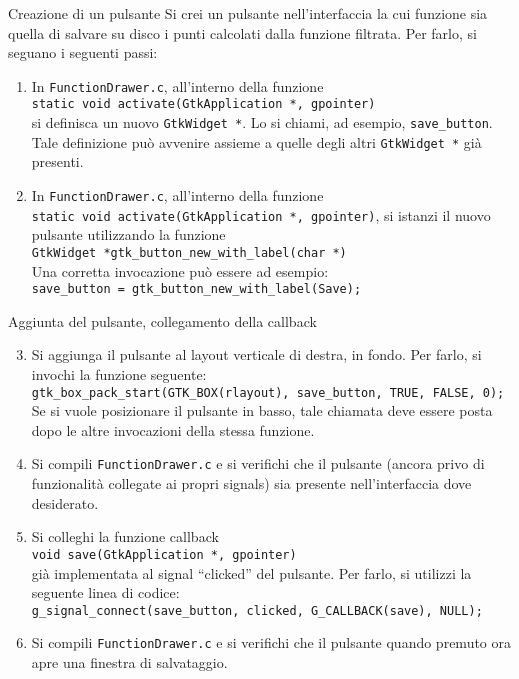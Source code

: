 \documentclass{beamer}
\begin{document}
\begin{frame}[fragile]{Creazione di un pulsante}
Si crei un pulsante nell'interfaccia la cui funzione sia quella di salvare su disco i punti calcolati dalla funzione filtrata. Per farlo, si seguano i seguenti passi:
\begin{enumerate}
 \item In \texttt{FunctionDrawer.c}, all'interno della funzione \\ \texttt{static void activate(GtkApplication *, gpointer)} \\ si definisca un nuovo \texttt{GtkWidget *}. Lo si chiami, ad esempio, \texttt{save\_button}. Tale definizione può avvenire assieme a quelle degli altri \texttt{GtkWidget *} già presenti.
 \item In \texttt{FunctionDrawer.c}, all'interno della funzione \\ \texttt{static void activate(GtkApplication *, gpointer)}, si istanzi il nuovo pulsante utilizzando la funzione\\ \texttt{GtkWidget *gtk\_button\_new\_with\_label(char *)}\\ Una corretta invocazione può essere ad esempio: \\ \texttt{save\_button = gtk\_button\_new\_with\_label(\textquotedbl{}Save\textquotedbl{});}
\end{enumerate}
\end{frame}

\begin{frame}[fragile]{Aggiunta del pulsante, collegamento della callback}
\begin{enumerate}
\setcounter{enumi}{2}
 \item Si aggiunga il pulsante al layout verticale di destra, in fondo. Per farlo, si invochi la funzione seguente: \\ \texttt{gtk\_box\_pack\_start(GTK\_BOX(rlayout), save\_button, TRUE, FALSE, 0);} \\ Se si vuole posizionare il pulsante in basso, tale chiamata deve essere posta dopo le altre invocazioni della stessa funzione.
 \item Si compili \texttt{FunctionDrawer.c} e si verifichi che il pulsante (ancora privo di funzionalità collegate ai propri signals) sia presente nell'interfaccia dove desiderato.
 \item Si colleghi la funzione callback \\ \texttt{void save(GtkApplication *, gpointer)} \\ già implementata al signal ``clicked'' del pulsante. Per farlo, si utilizzi la seguente linea di codice: \\ \texttt{g\_signal\_connect(save\_button, \textquotedbl{}clicked\textquotedbl{}, G\_CALLBACK(save), NULL);}
 \item Si compili \texttt{FunctionDrawer.c} e si verifichi che il pulsante quando premuto ora apre una finestra di salvataggio.
\end{enumerate}
\end{frame}
\end{document}
